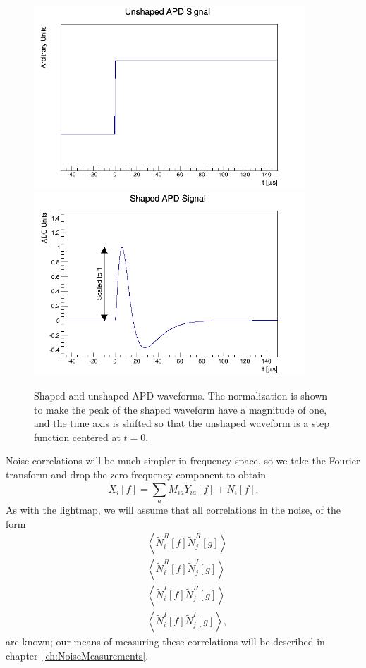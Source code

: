\begin{figure}
\begin{center}
\includegraphics[keepaspectratio=true,width=4in]{scripts/UnshapedAPDWaveform.png}
\includegraphics[keepaspectratio=true,width=4in]{scripts/ShapedAPDWaveform.png}
\end{center}
\renewcommand{\baselinestretch}{1}
\small\normalsize
\begin{quote}
\caption{Shaped and unshaped APD waveforms.  The normalization is shown to make the peak of the shaped waveform have a magnitude of one, and the time axis is shifted so that the unshaped waveform is a step function centered at $t=0$.}
\label{fig:SampleAPDTemplates}
\end{quote}
\end{figure}
\renewcommand{\baselinestretch}{2}
\small\normalsize

Noise correlations will be much simpler in frequency space, so we take the Fourier transform and drop the zero-frequency component to obtain
\begin{equation}
\widetilde{X}_i[f] = \sum_a M_{ia}\widetilde{Y}_{ia}[f] + \widetilde{N}_i[f].
\end{equation}
As with the lightmap, we will assume that all correlations in the noise, of the form
\begin{subequations}\begin{align}
&\left< \widetilde{N}^R_i[f]\widetilde{N}^R_j[g] \right> \\
&\left< \widetilde{N}^R_i[f]\widetilde{N}^I_j[g] \right> \\
&\left< \widetilde{N}^I_i[f]\widetilde{N}^R_j[g] \right> \\
&\left< \widetilde{N}^I_i[f]\widetilde{N}^I_j[g] \right>,
\end{align}\end{subequations}
are known; our means of measuring these correlations will be described in chapter~\ref{ch:NoiseMeasurements}.

